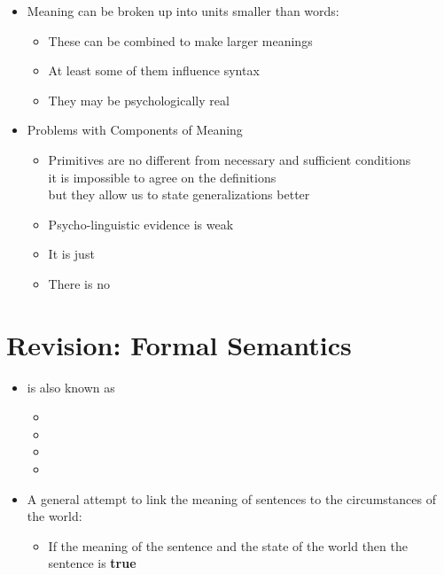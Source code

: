\documentclass[headrule,footrule]{foils}
\begin{document}
\begin{itemize}
\item Meaning can be broken up into units smaller than words:   
  \begin{itemize}
  \item These can be combined to make larger meanings
  \item At least some of them influence syntax
  \item They may be psychologically real
  \end{itemize}
\item Problems with Components of Meaning
  \begin{itemize}
  \item Primitives are no different from necessary and sufficient conditions
    \\ it is impossible to agree on the definitions
    \\ but they allow us to state generalizations better
  \item Psycho-linguistic evidence is weak
  \item It is just 
  \item There is no 
  \end{itemize}
\end{itemize}

\section{Revision: Formal Semantics}


\begin{itemize}
\item {} is also known as
  \begin{itemize}
  \item {}
  \item {}
  \item {}
  \item {}
  \end{itemize}
\item A general attempt to link the meaning of sentences to the
  circumstances of the world: 
  \begin{itemize}
  \item If the meaning of the sentence and the state of the world
     then the sentence is \textbf{true}
  \end{itemize}
\end{itemize}
\end{document}
